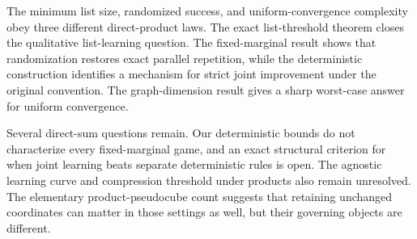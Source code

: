 \documentclass[twoside]{article}
\begin{document}
The minimum list size, randomized success, and uniform-convergence complexity obey three different direct-product laws. The exact list-threshold theorem closes the qualitative list-learning question. The fixed-marginal result shows that randomization restores exact parallel repetition, while the deterministic construction identifies a mechanism for strict joint improvement under the original convention. The graph-dimension result gives a sharp worst-case answer for uniform convergence.

Several direct-sum questions remain. Our deterministic bounds do not characterize every fixed-marginal game, and an exact structural criterion for when joint learning beats separate deterministic rules is open. The agnostic learning curve and compression threshold under products also remain unresolved. The elementary product-pseudocube count suggests that retaining unchanged coordinates can matter in those settings as well, but their governing objects are different.


\end{document}
